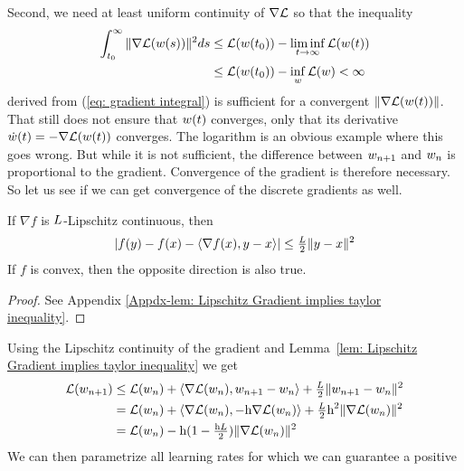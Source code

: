 Second, we need at least uniform continuity of \(\nabla \mathcal{L}\) so that the inequality
%
\begin{align}\label{eq: bounded gradient integral}
	\int_{t_0}^\infty \|\nabla \mathcal{L}(w(s))\|^2 ds
	&\le \mathcal{L}(w(t_0)) - \liminf_{t\to\infty} \mathcal{L}(w(t)) \\
	&\le \mathcal{L}(w(t_0)) - \inf_{w} \mathcal{L}(w) < \infty \nonumber
\end{align}
%
derived from (\ref{eq: gradient integral}) is sufficient for a convergent
\(\|\nabla \mathcal{L}(w(t))\|\). That still does not ensure that \(w(t)\)
converges, only that its derivative \(\dot{w}(t) = -\nabla \mathcal{L}(w(t))\)
converges. The logarithm is an obvious example where this goes wrong. But
while it is not sufficient, the difference between \(w_{n+1}\) and
\(w_n\) is proportional to the gradient. Convergence of the gradient is
therefore necessary.
So let us see if we can get convergence of the discrete gradients as well.
%
\begin{lemma}
	\label{lem: Lipschitz Gradient implies taylor inequality}
	If \(\nabla f\) is \(L\)-Lipschitz continuous, then
	\begin{align*}
		| f(y) - f(x) - \langle \nabla f(x), y-x\rangle |
		\le \tfrac{L}2 \|y-x\|^2
	\end{align*}
	If \(f\) is convex, then the opposite direction is also true.
\end{lemma}
\begin{proof}
	See Appendix \ref{Appdx-lem: Lipschitz Gradient implies taylor inequality}.
\end{proof}
%
\noindent
Using the Lipschitz continuity of the gradient and Lemma~\ref{lem: Lipschitz
Gradient implies taylor inequality} we get
%
\begin{align}
	\mathcal{L}(w_{n+1})
	&\le \mathcal{L}(w_n) 
	+ \langle\nabla \mathcal{L}(w_n),w_{n+1} - w_n\rangle
	+ \tfrac{L}{2} \| w_{n+1} - w_n\|^2 
	\label{eq: bound increment}\\
	&= \mathcal{L}(w_n)
	+ \langle\nabla \mathcal{L}(w_n), -\text{h}\nabla \mathcal{L}(w_n)\rangle
	+ \tfrac{L}{2}\text{h}^2\| \nabla \mathcal{L}(w_n)\|^2
	\nonumber\\
	&=\mathcal{L}(w_n) - \text{h}(1-\tfrac{\text{h} L}{2})\|\nabla \mathcal{L}(w_n)\|^2
	\nonumber
\end{align}
%
We can then parametrize all learning rates for which we can guarantee a positive
